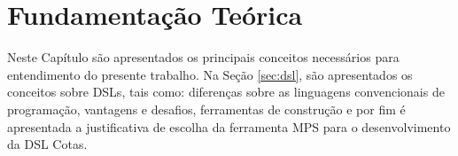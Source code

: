 \chapter{Fundamentação Teórica}
\label{chap:fundamentacao}

Neste Capítulo são apresentados os principais conceitos necessários para entendimento do presente trabalho. Na Seção \ref{sec:dsl}, são apresentados os conceitos sobre \gls{DSL}s, tais como: diferenças sobre as linguagens convencionais de programação, vantagens e desafios, ferramentas de construção e por fim é apresentada a justificativa de escolha da ferramenta \gls{MPS} para o desenvolvimento da DSL Cotas.






